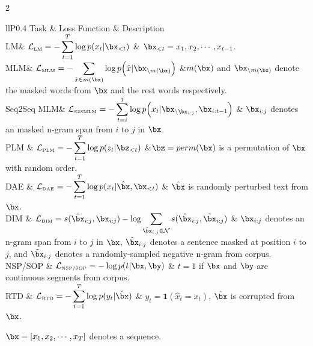 \documentclass[fleqn]{SCYE-arxiv}
\begin{document}
\begin{multicols}{2}
\begin{table*}[t]
 \footnotesize \centering
 \begin{threeparttable}\caption{Loss Functions of Pre-training Tasks}\label{tab:loss-function}
 \tabcolsep 10pt %
 \begin{tabular}{llP{0.4\linewidth}}
 \toprule
   Task & Loss Function & Description\\%
   \midrule %
   LM& $\displaystyle\mathcal{L}_{\textrm{\tiny LM}}=-\sum_{t=1}^{T} \log p(x_t|\bx_{<t})$ & $\bx_{<t} = x_1,x_2,\cdots,x_{t-1}$.\\
   \midrule
   MLM& $\displaystyle \mathcal{L}_{\textrm{\tiny MLM}}=-\sum_{\hat{x}\in m(\bx)} \log p\Big(\hat{x}|\bx_{\setminus m(\bx)}\Big)$ &$m(\bx)$ and $\bx_{\setminus m(\bx)}$ denote the masked words from $\bx$ and the rest words respectively.\\
   \midrule
   Seq2Seq MLM& $\displaystyle\mathcal{L}_{\textrm{\tiny S2SMLM}}=-\sum_{t=i}^j \log p\Big(x_t|\bx_{\setminus \bx_{i:j}},\bx_{i:t-1}\Big)$ & $\bx_{i:j}$ denotes an masked n-gram span from $i$ to $j$ in $\bx$.\\
      \midrule
   PLM & $\displaystyle \mathcal{L}_{\textrm{\tiny PLM}}=-\sum_{t=1}^{T} \log p(z_t|\bz_{<t})$  &$\bz=perm(\bx)$ is a permutation of $\bx$ with random order. \\
   \midrule
   DAE & $\displaystyle \mathcal{L}_{\textrm{\tiny DAE}}=-\sum_{t=1}^{T} \log p(x_t|\hat{\bx},\bx_{<t})$ & $\hat{\bx}$ is  randomly perturbed text from $\bx$.\\
   \midrule
   DIM & $\displaystyle \mathcal{L}_{\textrm{\tiny DIM}}= s(\hat{\bx}_{i:j},\bx_{i:j})-\log \sum_{\tilde{\bx}_{i:j}\in \mathcal{N}}s(\hat{\bx}_{i:j},\tilde{\bx}_{i:j})$ & $\bx_{i:j}$ denotes an n-gram span from $i$ to $j$ in $\bx$, $\hat{\bx}_{i:j}$ denotes a sentence masked at position $i$ to $j$, and $\tilde{\bx}_{i:j}$ denotes a randomly-sampled  negative n-gram from corpus.\\
   \midrule
   NSP/SOP & $\displaystyle \mathcal{L}_{\textrm{\tiny NSP/SOP}}=-\log p(t|\bx,\by)$ & $t=1$ if $\bx$ and $\by$ are continuous segments from corpus.\\
   \midrule
   RTD & $\displaystyle \mathcal{L}_{\textrm{\tiny RTD}}=-\sum_{t=1}^{T} \log p(y_t|\hat{\bx})$ & $y_t=\mathbf{1}(\hat{x}_t=x_t)$, $\hat{\bx}$ is corrupted from $\bx$.\\
 \bottomrule
 \end{tabular}
 \begin{tablenotes}
\item[$1$] $\bx=[x_1,x_2,\cdots,x_T]$ denotes a sequence.
\end{tablenotes}
 \end{threeparttable}
\end{table*}



\end{multicols}
\end{document}
